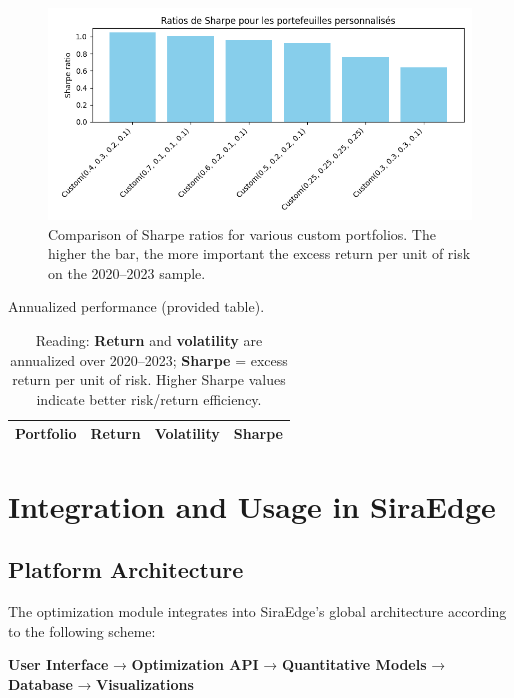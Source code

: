 \documentclass[11pt,a4paper]{article}
\begin{document}
\begin{figure}[h]
  \centering
  \includegraphics[width=0.9\linewidth]{../../figures/custom_portfolios_sharpe.png}
  \caption{Comparison of Sharpe ratios for various custom portfolios. The higher the bar, the more important the excess return per unit of risk on the 2020--2023 sample.}
  \label{fig:custom_sharpe_external}
\end{figure}

\begin{table}[h]
  \centering
  \caption{Annualized performance (provided table).}
  \label{tab:summary_external}
  \begin{tabular}{lccc}
    \hline
    Portfolio & Return & Volatility & Sharpe \\
    \hline
    
  \end{tabular}
  \caption*{\footnotesize Reading: \textbf{Return} and \textbf{volatility} are annualized over 2020--2023; \textbf{Sharpe} = excess return per unit of risk. Higher Sharpe values indicate better risk/return efficiency.}
\end{table}

\section{Integration and Usage in SiraEdge}

\subsection{Platform Architecture}
The optimization module integrates into SiraEdge's global architecture according to the following scheme:

\begin{center}
\begin{tcolorbox}[title=SiraEdge Architecture - Optimization Module]
\textbf{User Interface} → \textbf{Optimization API} → \textbf{Quantitative Models} → \textbf{Database} → \textbf{Visualizations}
\end{tcolorbox}
\end{center}
\end{document}
